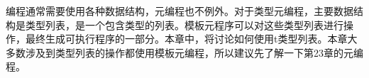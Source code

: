 编程通常需要使用各种数据结构，元编程也不例外。对于类型元编程，主要数据结构是类型列表，是一个包含类型的列表。模板元程序可以对这些类型列表进行操作，最终生成可执行程序的一部分。本章中，将讨论如何使用t类型列表。本章大多数涉及到类型列表的操作都使用模板元编程，所以建议先了解一下第23章的元编程。